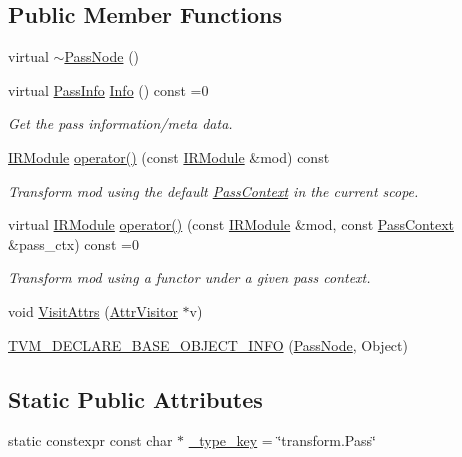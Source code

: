 \subsection*{Public Member Functions}
\begin{DoxyCompactItemize}
\item 
virtual \hyperlink{classtvm_1_1transform_1_1PassNode_ad8fd84de45a9445aacea6273ae2eb7f6}{$\sim$\+Pass\+Node} ()
\item 
virtual \hyperlink{classtvm_1_1transform_1_1PassInfo}{Pass\+Info} \hyperlink{classtvm_1_1transform_1_1PassNode_ab602b215ed172c9f09cf0fa2862858af}{Info} () const =0
\begin{DoxyCompactList}\small\item\em Get the pass information/meta data. \end{DoxyCompactList}\item 
\hyperlink{classtvm_1_1IRModule}{I\+R\+Module} \hyperlink{classtvm_1_1transform_1_1PassNode_a3fa3ffce313008085951ac8dccdf28d4}{operator()} (const \hyperlink{classtvm_1_1IRModule}{I\+R\+Module} \&mod) const 
\begin{DoxyCompactList}\small\item\em Transform mod using the default \hyperlink{classtvm_1_1transform_1_1PassContext}{Pass\+Context} in the current scope. \end{DoxyCompactList}\item 
virtual \hyperlink{classtvm_1_1IRModule}{I\+R\+Module} \hyperlink{classtvm_1_1transform_1_1PassNode_acc3c5938c9ba37ada87eb6ac35539b2f}{operator()} (const \hyperlink{classtvm_1_1IRModule}{I\+R\+Module} \&mod, const \hyperlink{classtvm_1_1transform_1_1PassContext}{Pass\+Context} \&pass\+\_\+ctx) const =0
\begin{DoxyCompactList}\small\item\em Transform mod using a functor under a given pass context. \end{DoxyCompactList}\item 
void \hyperlink{classtvm_1_1transform_1_1PassNode_af04aed6a576c3a4b9c2969d6f190cd37}{Visit\+Attrs} (\hyperlink{classtvm_1_1AttrVisitor}{Attr\+Visitor} $\ast$v)
\item 
\hyperlink{classtvm_1_1transform_1_1PassNode_a8e93e7451cad3c7d5d39c49bc51d748b}{T\+V\+M\+\_\+\+D\+E\+C\+L\+A\+R\+E\+\_\+\+B\+A\+S\+E\+\_\+\+O\+B\+J\+E\+C\+T\+\_\+\+I\+N\+FO} (\hyperlink{classtvm_1_1transform_1_1PassNode}{Pass\+Node}, Object)
\end{DoxyCompactItemize}
\subsection*{Static Public Attributes}
\begin{DoxyCompactItemize}
\item 
static constexpr const char $\ast$ \hyperlink{classtvm_1_1transform_1_1PassNode_a4e95f892a77bfa9173892e88b032a4a8}{\+\_\+type\+\_\+key} = \char`\"{}transform.\+Pass\char`\"{}
\end{DoxyCompactItemize}


